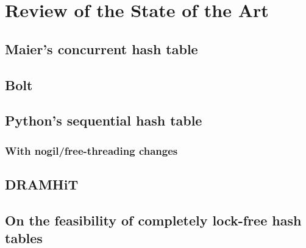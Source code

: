 \chapter{Review of the State of the Art}

\section{Maier's concurrent hash table}

\cite{maier}

\section{Bolt}

\cite{bolt}

\section{Python's sequential hash table}

\subsection{With nogil/free-threading changes}

\section{DRAMHiT}

\cite{dramhit}

\section{On the feasibility of completely lock-free hash tables}

\cite{hesselink}
